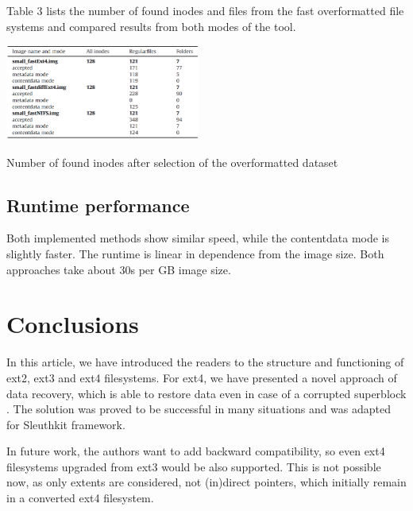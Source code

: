 \documentclass{acm_proc_article-sp}
\begin{document}
Table 3 lists the number of found inodes and files from the fast overformatted file systems and compared results from both modes of the tool.

\begin{table}
\centering
\includegraphics[width=0.48\textwidth]{images/number.png}
	\caption{Number of found inodes after selection of the overformatted dataset}
\end{table}

\subsection{Runtime performance}

Both implemented methods show similar speed, while the contentdata mode is slightly faster. The runtime is linear in dependence from the image size. Both approaches take about 30s per GB image size.

\section{Conclusions}

In this article, we have introduced the readers to the structure and functioning of ext2, ext3 and ext4 filesystems. For ext4, we have presented a novel approach of data recovery, which is able to restore data even in case of a corrupted superblock \cite{afeic}. The solution was proved to be successful in many situations and was adapted for Sleuthkit framework.

In future work, the authors want to add backward compatibility, so even ext4 filesystems upgraded from ext3 would be also supported. This is not possible now, as only extents are considered, not (in)direct pointers, which initially remain in a converted ext4 filesystem.




\balancecolumns
\end{document}
